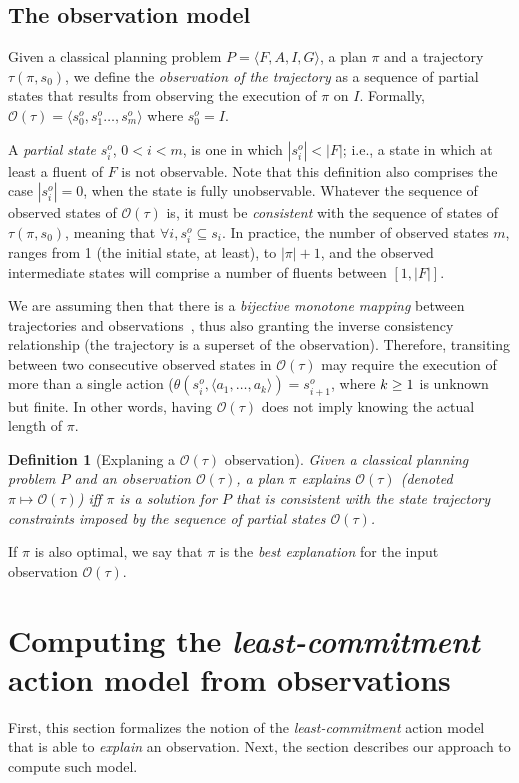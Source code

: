 \documentclass{article}
\newcommand{\tup}[1]{{\langle #1 \rangle}}
\newtheorem{definition}[theorem]{Definition}
\begin{document}
\subsection{The observation model}
Given a classical planning problem $P=\tup{F,A,I,G}$, a plan $\pi$ and a trajectory $\tau(\pi,s_0)$, we define the \emph{observation of the trajectory} as a sequence of partial states that results from observing the execution of $\pi$ on $I$. Formally, $\mathcal{O}(\tau)=\tup{s_0^o,s_1^o \ldots , s_m^o}$ where $s_0^o=I$.

A {\em partial state} $s_i^o$, {\small $0<i<m$}, is one in which $|s_i^o| < |F|$; i.e., a state in which at least a fluent of $F$ is not observable. Note that this definition also comprises the case $|s_i^o| = 0$, when the state is fully unobservable. Whatever the sequence of observed states of $\mathcal{O}(\tau)$ is, it must be {\em consistent} with the sequence of states of $\tau(\pi,s_0)$, meaning that $\forall i, s_i^o \subseteq s_i$. In practice, the number of observed states $m$, ranges from 1 (the initial state, at least), to $|\pi|+1$, and the observed intermediate states will comprise a number of fluents between $[1,|F|]$.

\newpage

We are assuming then that there is a {\em bijective monotone mapping} between trajectories and observations~\cite{ramirez2009plan}, thus also granting the inverse consistency relationship (the trajectory is a superset of the observation). Therefore, transiting between two consecutive observed states in $\mathcal{O}(\tau)$ may require the execution of more than a single action ($\theta(s_i^o,\tup{a_1,\ldots,a_k})=s_{i+1}^o$, where ${\small k\geq 1}$ is unknown but finite. In other words, having $\mathcal{O}(\tau)$ does not imply knowing the actual length of $\pi$.

\begin{definition}[Explaning a $\mathcal{O}(\tau)$ observation]
Given a {\em classical planning problem} $P$ and an observation $\mathcal{O}(\tau)$, a plan $\pi$ {\em explains} $\mathcal{O}(\tau)$ (denoted $\pi\mapsto\mathcal{O}(\tau)$) iff $\pi$ is a solution for $P$ that is {\em consistent} with the state trajectory constraints imposed by the sequence of partial states $\mathcal{O}(\tau)$.  
\end{definition}
If $\pi$ is also optimal, we say that $\pi$ is the {\em best explanation} for the input observation $\mathcal{O}(\tau)$.



\section{Computing the {\em least-commitment} action model from observations}
First, this section formalizes the notion of the {\em least-commitment} action model that is able to {\em explain} an observation. Next, the section describes our approach to compute such model. 
\end{document}
